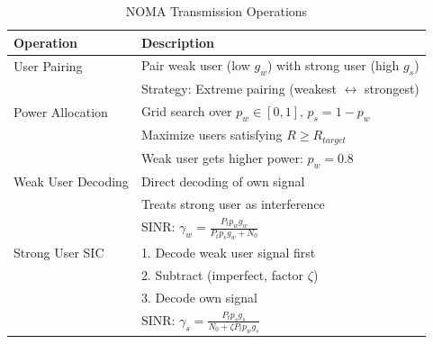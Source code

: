 \begin{table}[h]
\centering
\caption{NOMA Transmission Operations}
\label{tab:noma_ops}
\begin{tabular}{|l|p{8cm}|}
\hline
\textbf{Operation} & \textbf{Description} \\
\hline
User Pairing & Pair weak user (low $g_w$) with strong user (high $g_s$) \\
            & Strategy: Extreme pairing (weakest $\leftrightarrow$ strongest) \\
\hline
Power Allocation & Grid search over $p_w \in [0,1]$, $p_s = 1 - p_w$ \\
                & Maximize users satisfying $R \geq R_{target}$ \\
                & Weak user gets higher power: $p_w = 0.8$ \\
\hline
Weak User Decoding & Direct decoding of own signal \\
                   & Treats strong user as interference \\
                   & SINR: $\gamma_w = \frac{P_t p_w g_w}{P_t p_s g_w + N_0}$ \\
\hline
Strong User SIC & 1. Decode weak user signal first \\
                & 2. Subtract (imperfect, factor $\zeta$) \\
                & 3. Decode own signal \\
                & SINR: $\gamma_s = \frac{P_t p_s g_s}{N_0 + \zeta P_t p_w g_s}$ \\
\hline
\end{tabular}
\end{table}
